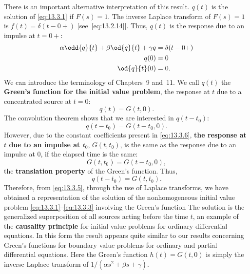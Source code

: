 There is an important alternative interpretation of this result.  $q(t)$ is the solution of \eqref{eq:13.3.1} if $F(s)=1$.  The inverse Laplace transform of $F(s)=1$ is $f(t)=\delta(t-0{+})$ [see~\eqref{eq:13.2.14}].  Thus, $q(t)$ is the response due to an impulse at $t=0{+}$:
\begin{equation}
\begin{aligned}
\alpha\odd{q}{t} + \beta\od{q}{t} + \gamma q &= \delta(t-0{+}) \\
q(0) &= 0 \\
\od{q}{t}(0) &= 0.
\end{aligned}
\label{eq:13.3.6}
\end{equation}
We can introduce the terminology of Chapters~9 and~11.  We call $q(t)$ the \textbf{Green's function for the initial value problem}, the response at $t$ due to a concentrated source at $t=0$:
\[
q(t) = G(t,0).
\]
The convolution theorem shows that we are interested in $q(t-t_0)$:
\[
q(t-t_0) = G(t-t_0,0).
\]
However, due to the constant coefficients present in \eqref{eq:13.3.6}, \textbf{the response at $t$ due to an impulse at $t_0$}, $G(t,t_0)$, is the same as the response due to an impulse at $0$, if the elapsed time is the same:
\begin{equation}
G(t,t_0) = G(t-t_0,0),
\label{eq:13.3.7}
\end{equation}
the \textbf{translation property} of the Green's function.  Thus,
\[
q(t-t_0) = G(t,t_0).
\]
Therefore, from \eqref{eq:13.3.5}, through the use of Laplace transforms, we have obtained a representation of the solution of the nonhomogeneous initial value problem \eqref{eq:13.3.1}--\eqref{eq:13.3.3} involving the Green's function
The solution is the generalized superposition of all sources acting before the time $t$, an example of the \textbf{causality principle} for initial value problems for ordinary differential equations.  In this form the result appears quite similar to our results concerning Green's functions for boundary value problems for ordinary and partial differential equations.  Here the Green's function $h(t) = G(t,0)$ is simply the inverse Laplace transform of $1/(\alpha s^2 + \beta s + \gamma)$.

